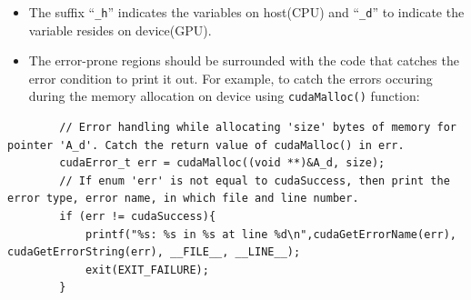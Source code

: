 \begin{itemize}
    \item The suffix \enquote{\texttt{\_h}} indicates the variables on host(CPU) and \enquote{\texttt{\_d}} to indicate the variable resides on device(GPU).
    \item The error-prone regions should be surrounded with the code that catches the error condition to print it out. For example, to catch the errors occuring during the memory allocation on device using \texttt{cudaMalloc()} function:
\end{itemize}
\begin{code}
    \begin{verbatim}
        // Error handling while allocating 'size' bytes of memory for pointer 'A_d'. Catch the return value of cudaMalloc() in err.
        cudaError_t err = cudaMalloc((void **)&A_d, size);
        // If enum 'err' is not equal to cudaSuccess, then print the error type, error name, in which file and line number.
        if (err != cudaSuccess){
            printf("%s: %s in %s at line %d\n",cudaGetErrorName(err), cudaGetErrorString(err), __FILE__, __LINE__);
            exit(EXIT_FAILURE);
        }
\end{verbatim}

\end{code}
